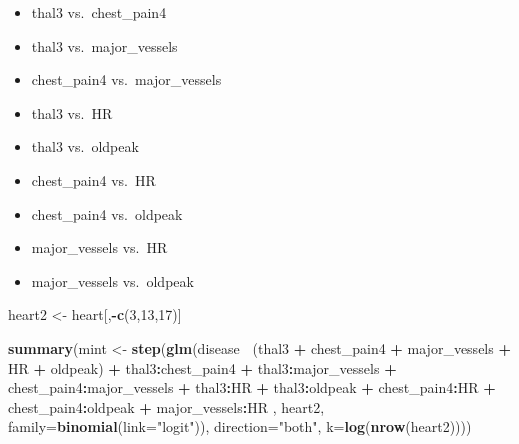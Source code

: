\documentclass[]{article}
\newenvironment{Shaded}{\begin{snugshade}}{\end{snugshade}}
\newcommand{\KeywordTok}[1]{\textcolor[rgb]{0.13,0.29,0.53}{\textbf{#1}}}
\newcommand{\DataTypeTok}[1]{\textcolor[rgb]{0.13,0.29,0.53}{#1}}
\newcommand{\DecValTok}[1]{\textcolor[rgb]{0.00,0.00,0.81}{#1}}
\newcommand{\StringTok}[1]{\textcolor[rgb]{0.31,0.60,0.02}{#1}}
\newcommand{\OperatorTok}[1]{\textcolor[rgb]{0.81,0.36,0.00}{\textbf{#1}}}
\newcommand{\NormalTok}[1]{#1}
\providecommand{\tightlist}{%
  \setlength{\itemsep}{0pt}\setlength{\parskip}{0pt}}
\begin{document}
\begin{itemize}
\tightlist
\item
  thal3 vs.~chest\_pain4
\item
  thal3 vs.~major\_vessels
\item
  chest\_pain4 vs.~major\_vessels
\item
  thal3 vs.~HR
\item
  thal3 vs.~oldpeak
\item
  chest\_pain4 vs.~HR
\item
  chest\_pain4 vs.~oldpeak
\item
  major\_vessels vs.~HR
\item
  major\_vessels vs.~oldpeak
\end{itemize}

\begin{Shaded}
\begin{Highlighting}[]
\NormalTok{heart2 <-}\StringTok{ }\NormalTok{heart[,}\OperatorTok{-}\KeywordTok{c}\NormalTok{(}\DecValTok{3}\NormalTok{,}\DecValTok{13}\NormalTok{,}\DecValTok{17}\NormalTok{)]}

\KeywordTok{summary}\NormalTok{(mint <-}\StringTok{ }\KeywordTok{step}\NormalTok{(}\KeywordTok{glm}\NormalTok{(disease}\OperatorTok{~}\StringTok{ }\NormalTok{(thal3 }\OperatorTok{+}\StringTok{ }\NormalTok{chest_pain4 }\OperatorTok{+}\StringTok{ }\NormalTok{major_vessels }\OperatorTok{+}\StringTok{ }\NormalTok{HR }\OperatorTok{+}\StringTok{ }\NormalTok{oldpeak) }\OperatorTok{+}\StringTok{ }\NormalTok{thal3}\OperatorTok{:}\NormalTok{chest_pain4 }\OperatorTok{+}\StringTok{ }\NormalTok{thal3}\OperatorTok{:}\NormalTok{major_vessels }\OperatorTok{+}\StringTok{ }\NormalTok{chest_pain4}\OperatorTok{:}\NormalTok{major_vessels }\OperatorTok{+}\StringTok{ }\NormalTok{thal3}\OperatorTok{:}\NormalTok{HR }\OperatorTok{+}\StringTok{ }\NormalTok{thal3}\OperatorTok{:}\NormalTok{oldpeak }\OperatorTok{+}\StringTok{ }\NormalTok{chest_pain4}\OperatorTok{:}\NormalTok{HR }\OperatorTok{+}\StringTok{ }\NormalTok{chest_pain4}\OperatorTok{:}\NormalTok{oldpeak }\OperatorTok{+}\StringTok{ }\NormalTok{major_vessels}\OperatorTok{:}\NormalTok{HR , heart2, }\DataTypeTok{family=}\KeywordTok{binomial}\NormalTok{(}\DataTypeTok{link=}\StringTok{"logit"}\NormalTok{)), }\DataTypeTok{direction=}\StringTok{"both"}\NormalTok{, }\DataTypeTok{k=}\KeywordTok{log}\NormalTok{(}\KeywordTok{nrow}\NormalTok{(heart2))))}
\end{Highlighting}
\end{Shaded}
\end{document}

